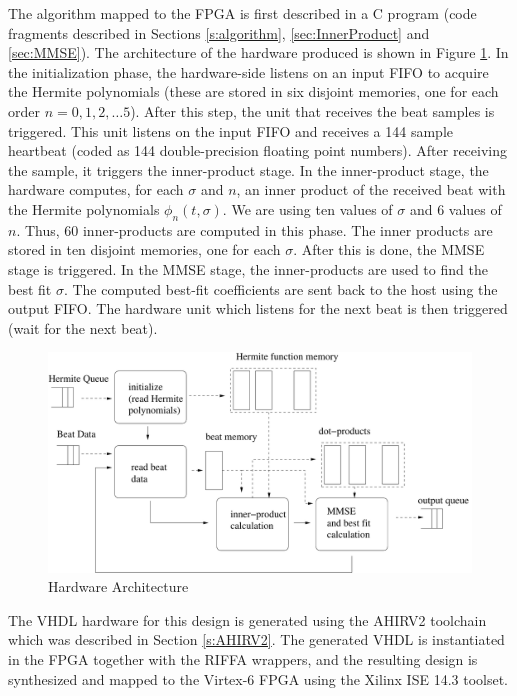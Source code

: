 \documentclass[conference]{IEEEtran}
\begin{document}
The algorithm mapped to the FPGA 
is first described in a C program (code fragments described in Sections \ref{s:algorithm},  \ref{sec:InnerProduct} and \ref{sec:MMSE}).
The architecture of the hardware produced is shown in Figure \ref{fig:HardwareArchitecture}.
In the initialization phase, the hardware-side listens on an input FIFO to acquire
the Hermite polynomials (these are stored in six disjoint memories, one
for each order $n=0,1,2,\ldots 5$).  After this step, the unit that receives
the beat samples is triggered.  This unit listens on the input FIFO and receives a 144 sample
heartbeat (coded as 144 double-precision floating point numbers).  After receiving
the sample, it triggers the inner-product stage.  In the inner-product stage, the hardware computes, for each $\sigma$ and
$n$, an inner product of the received beat with the Hermite polynomials $\phi_n(t,\sigma)$.
We are using ten values of $\sigma$ and $6$ values of $n$.  Thus, 60 inner-products
are computed in this phase.  The inner products are stored in ten
disjoint memories, one for each $\sigma$.  After this is done, the MMSE
stage is triggered.  In the MMSE stage, the inner-products are used to find the best fit $\sigma$.
The computed best-fit coefficients are sent back to the host using the output FIFO.
The hardware unit which listens for the next beat is then triggered (wait for the next beat).

\begin{figure}
\begin{center}
	\includegraphics[width=\linewidth]{HardwareArchitecture.pdf}
	\caption{Hardware Architecture}
	\label{fig:HardwareArchitecture}
\end{center}
\end{figure}

The VHDL hardware for this design is generated using the AHIRV2 toolchain
which was described in Section \ref{s:AHIRV2}.  
The generated VHDL is instantiated in the FPGA together with the RIFFA wrappers,
and the resulting design is synthesized and mapped to the Virtex-6 FPGA using
the Xilinx ISE 14.3 toolset.
\end{document}
